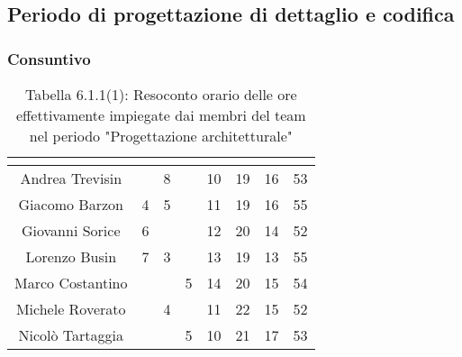\subsection{Periodo di progettazione di dettaglio e codifica}
\subsubsection{Consuntivo}
\renewcommand{\arraystretch}{1.5}
\begin{table}[H]
\begin{center}
\begin{tabular}{|c|c|c|c|c|c|c|c|}
\hline
\rowcolor{title_row}
\textbf{\color{title_text}{Nome}} & \textbf{\color{title_text}{Resp.}} & \textbf{\color{title_text}{Ammi.}} & \textbf{\color{title_text}{Analist.}} & \textbf{\color{title_text}{Progett.}} & \textbf{\color{title_text}{Program.}} & \textbf{\color{title_text}{Verific.}} & \textbf{\color{title_text}{Totale}} \\ \hline
Andrea Trevisin  & & 8 & & 10 & 19 & 16 & 53 \\ \hline
Giacomo Barzon   & 4 & 5 & & 11 & 19 & 16 & 55  \\ \hline
Giovanni Sorice  & 6 & & & 12 & 20 & 14 & 52 \\ \hline
Lorenzo Busin    & 7 & 3 & & 13 & 19 & 13 & 55 \\ \hline
Marco Costantino & & & 5 & 14 & 20 & 15 & 54 \\ \hline     
Michele Roverato & & 4 & & 11 & 22 & 15 & 52 \\ \hline    
Nicolò Tartaggia & & & 5 & 10 & 21 & 17 & 53 \\ \hline
\end{tabular}
\caption{Tabella 6.1.1(1): Resoconto orario delle ore effettivamente impiegate dai membri del team nel periodo "Progettazione architetturale"\label{}}
\end{center}
\end{table}
\renewcommand{\arraystretch}{1}

